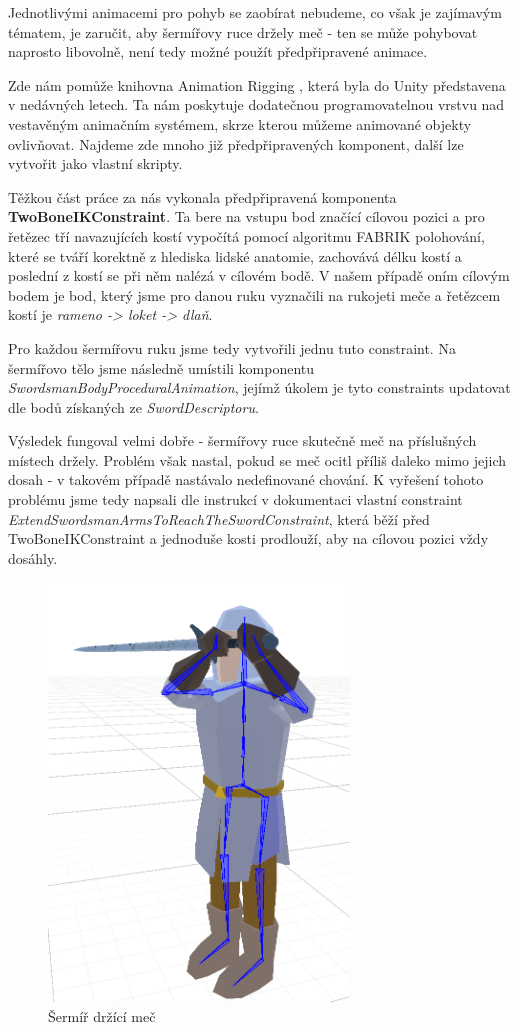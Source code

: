 Jednotlivými animacemi pro pohyb se zaobírat nebudeme, co však je zajímavým tématem, je zaručit, aby šermířovy ruce držely meč - ten se může pohybovat naprosto libovolně, není tedy možné použít předpřipravené animace. 

Zde nám pomůže knihovna Animation Rigging \cite{AnimationRigging}, která byla do Unity představena v nedávných letech. Ta nám poskytuje dodatečnou programovatelnou vrstvu nad vestavěným animačním systémem, skrze kterou můžeme animované objekty ovlivňovat. Najdeme zde mnoho již předpřipravených komponent, další lze vytvořit jako vlastní skripty.

Těžkou část práce za nás vykonala předpřipravená komponenta \textbf{TwoBoneIKConstraint}. Ta bere na vstupu bod značící cílovou pozici a pro řetězec tří navazujících kostí vypočítá pomocí algoritmu FABRIK \cite{FabrikSolverIK} polohování, které se tváří korektně z hlediska lidské anatomie, zachovává délku kostí a poslední z kostí se při něm nalézá v cílovém bodě. V našem případě oním cílovým bodem je bod, který jsme pro danou ruku vyznačili na rukojeti meče a řetězcem kostí je \textit{rameno -> loket -> dlaň}.

Pro každou šermířovu ruku jsme tedy vytvořili jednu tuto constraint. Na šermířovo tělo jsme následně umístili komponentu \textit{SwordsmanBodyProceduralAnimation}, jejímž úkolem je tyto constraints updatovat dle bodů získaných ze \textit{SwordDescriptoru}. 

Výsledek fungoval velmi dobře - šermířovy ruce skutečně meč na příslušných místech držely. Problém však nastal, pokud se meč ocitl příliš daleko mimo jejich dosah - v takovém případě nastávalo nedefinované chování. K vyřešení tohoto problému jsme tedy napsali dle instrukcí v dokumentaci vlastní constraint \textit{ExtendSwordsmanArmsToReachTheSwordConstraint}, která běží před TwoBoneIKConstraint a jednoduše kosti prodlouží, aby na cílovou pozici vždy dosáhly.


\begin{figure}[ht]\centering
  \center
  \includegraphics[width=80mm]{../img/swordsmanProceduralAnimation.png}
  \caption{Šermíř držící meč}
  \label{obr05:swordsmanProceduralAnimation}
\end{figure} 


